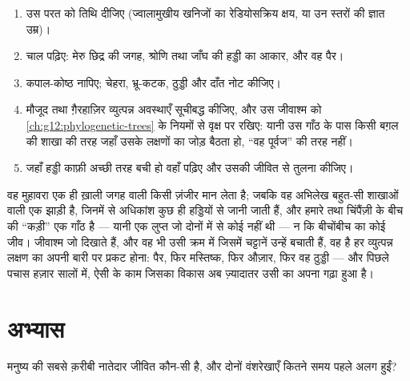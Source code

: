 \begin{method}[किसी जीवाश्म को जगह देना]\label{met:g12:human-evolution:placing}
\begin{enumerate}
  \item उस परत को तिथि दीजिए (ज्वालामुखीय खनिजों का रेडियोसक्रिय क्षय, या
        उन स्तरों की ज्ञात उम्र)।
  \item चाल पढ़िए: मेरु छिद्र की जगह, श्रोणि तथा जाँघ की हड्डी का आकार,
        और वह पैर।
  \item कपाल-कोष्ठ नापिए; चेहरा, भ्रू-कटक, ठुड्डी और दाँत नोट कीजिए।
  \item मौजूद तथा ग़ैरहाज़िर व्युत्पन्न अवस्थाएँ सूचीबद्ध कीजिए, और उस
        जीवाश्म को \cref{ch:g12:phylogenetic-trees} के नियमों से वृक्ष पर
        रखिए: यानी उस गाँठ के पास किसी बग़ल की शाखा की तरह जहाँ उसके
        लक्षणों का जोड़ बैठता हो, ``वह पूर्वज'' की तरह नहीं।
  \item जहाँ हड्डी काफ़ी अच्छी तरह बची हो वहाँ  पढ़िए और उसकी जीवित
         से तुलना कीजिए।
\end{enumerate}
\end{method}

\begin{remark}[कोई खोई कड़ी नहीं]\label{rem:g12:human-evolution:link}
वह मुहावरा एक ही ख़ाली जगह वाली किसी ज़ंजीर मान लेता है; जबकि वह अभिलेख
बहुत-सी शाखाओं वाली एक झाड़ी है, जिनमें से अधिकांश कुछ ही हड्डियों से जानी
जाती हैं, और हमारे तथा चिंपैंज़ी के बीच की ``कड़ी'' एक गाँठ है --- यानी एक
लुप्त  जो दोनों में से कोई नहीं थी --- न कि बीचोंबीच का कोई जीव।
जीवाश्म जो दिखाते हैं, और वह भी उसी क्रम में जिसमें चट्टानें उन्हें बचाती
हैं, वह है हर व्युत्पन्न लक्षण का अपनी बारी पर प्रकट होना: पैर, फिर
मस्तिष्क, फिर औज़ार, फिर वह ठुड्डी --- और पिछले पचास हज़ार सालों में, ऐसी
 के काम जिसका विकास अब ज़्यादातर उसी का अपना गढ़ा हुआ है।
\end{remark}

\section{अभ्यास}

\begin{exercise}[$\star$]\label{exo:g12:human-evolution:1}
मनुष्य की सबसे क़रीबी नातेदार जीवित  कौन-सी है, और दोनों वंशरेखाएँ
कितने समय पहले अलग हुईं?
\end{exercise}

